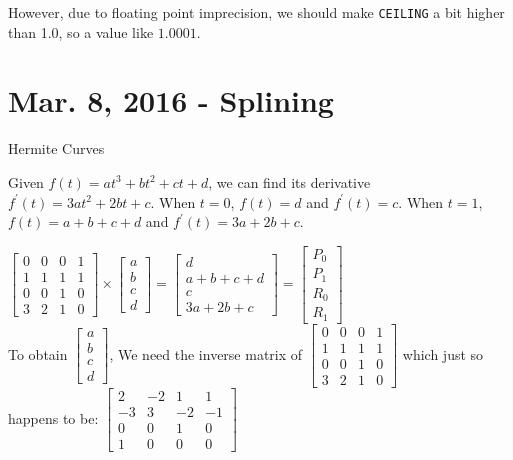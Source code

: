 \documentclass[11pt,fleqn]{article}
\theoremstyle{definition}
\begin{document}
However, due to floating point imprecision, we should make \texttt{CEILING} a bit
higher than 1.0, so a value like $1.0001$.

\section{Mar. 8, 2016 - Splining}

\begin{center}
    Hermite Curves
\end{center}

Given $f(t) = at^3 + bt^2 + ct + d$, we can find its derivative $f^{'}(t) = 3at^2 +
2bt + c$. When $t = 0$, $f(t) = d$ and $f^{'}(t) = c$. When $t = 1$, $f(t) = a + b +
c + d$ and $f^{'}(t) = 3a + 2b + c$.

$
\begin{bmatrix}
    0 & 0 & 0 & 1 \\
    1 & 1 & 1 & 1 \\
    0 & 0 & 1 & 0 \\
    3 & 2 & 1 & 0
\end{bmatrix}
\times
\begin{bmatrix}
    a \\
    b \\
    c \\
    d
\end{bmatrix}
=
\begin{bmatrix}
    d \\
    a + b + c + d \\
    c \\
    3a + 2b + c
\end{bmatrix}
=
\begin{bmatrix}
    P_0 \\
    P_1 \\
    R_0 \\
    R_1
\end{bmatrix}
$ \\

To obtain
$
\begin{bmatrix}
    a \\
    b \\
    c \\
    d
\end{bmatrix}
$, We need the inverse matrix of
$
\begin{bmatrix}
    0 & 0 & 0 & 1 \\
    1 & 1 & 1 & 1 \\
    0 & 0 & 1 & 0 \\
    3 & 2 & 1 & 0
\end{bmatrix}
$
which just so happens to be:
$
\begin{bmatrix}
    2 & -2 & 1 & 1 \\
    -3 & 3 & -2 & -1 \\
    0 & 0 & 1 & 0 \\
    1 & 0 & 0 & 0
\end{bmatrix}
$
\end{document}
